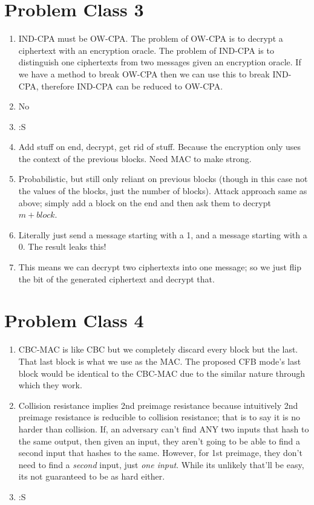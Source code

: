 \section{Problem Class 3}
	\begin{enumerate}
		\item IND-CPA must be OW-CPA. The problem of OW-CPA is to decrypt a ciphertext with an encryption oracle. The problem of IND-CPA is to distinguish one ciphertexts from two messages given an encryption oracle. If we have a method to break OW-CPA then we can use this to break IND-CPA, therefore IND-CPA can be reduced to OW-CPA.
		\item No
		\item :S
		\item Add stuff on end, decrypt, get rid of stuff. Because the encryption only uses the context of the previous blocks. Need MAC to make strong.
		\item Probabilistic, but still only reliant on previous blocks (though in this case not the values of the blocks, just the number of blocks). Attack approach same as above; simply add a block on the end and then ask them to decrypt $m+block$.
		\item Literally just send a message starting with a 1, and a message starting with a 0. The result leaks this!
		\item This means we can decrypt two ciphertexts into one message; so we just flip the bit of the generated ciphertext and decrypt that.
	\end{enumerate}

\section{Problem Class 4}
	\begin{enumerate}
		\item CBC-MAC is like CBC but we completely discard every block but the last. That last block is what we use as the MAC. The proposed CFB mode's last block would be identical to the CBC-MAC due to the similar nature through which they work.
		\item Collision resistance implies 2nd preimage resistance because intuitively 2nd preimage resistance is reducible to collision resistance; that is to say it is no harder than collision. If, an adversary can't find ANY two inputs that hash to the same output, then given an input, they aren't going to be able to find a second input that hashes to the same. However, for 1st preimage, they don't need to find a \textit{second} input, just \textit{one input}. While its unlikely that'll be easy, its not guaranteed to be as hard either.
		\item :S
	\end{enumerate}


